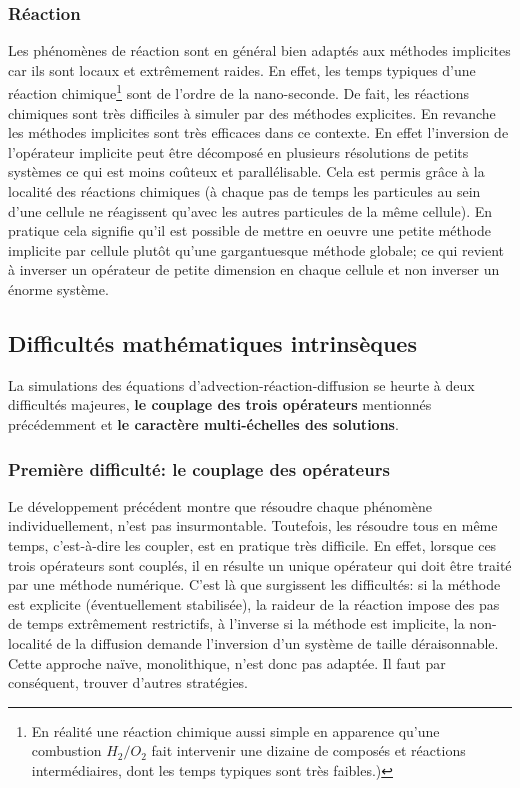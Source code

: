 \subsubsection{Réaction}
    Les phénomènes de réaction sont en général bien adaptés aux méthodes implicites car ils sont locaux et extrêmement raides.
    En effet, les temps typiques d'une réaction chimique\footnote{
    En réalité une réaction chimique aussi simple en apparence qu'une combustion $H_2/O_2$ fait intervenir une dizaine de composés et réactions intermédiaires, dont les temps typiques sont très faibles.)} sont de l'ordre de la nano-seconde.
    De fait, les réactions chimiques sont très difficiles à simuler par des méthodes explicites.
    En revanche les méthodes implicites sont très efficaces dans ce contexte. En effet l'inversion de l'opérateur implicite 
    peut être décomposé en plusieurs résolutions de petits systèmes ce qui est moins coûteux et parallélisable. Cela est permis grâce à la localité des réactions chimiques
    (à chaque pas de temps les particules au sein d'une cellule ne réagissent qu'avec les autres particules de la même cellule).
    En pratique cela signifie qu'il est possible de mettre en oeuvre une petite méthode implicite par cellule plutôt qu'une gargantuesque méthode globale; 
    ce qui revient à inverser un opérateur de petite dimension en chaque cellule et non inverser un énorme système.

\subsection{Difficultés mathématiques intrinsèques}
    La simulations des équations d'advection-réaction-diffusion se heurte à deux difficultés majeures, \textbf{le couplage des trois opérateurs} mentionnés précédemment
    et \textbf{le caractère multi-échelles des solutions}.

    \subsubsection{Première difficulté: le couplage des opérateurs}
        Le développement précédent montre que résoudre chaque phénomène individuellement, n'est pas insurmontable. 
        Toutefois, les résoudre tous en même temps, c'est-à-dire les coupler, est en pratique très difficile.
        En effet, lorsque ces trois opérateurs sont couplés, il en résulte un unique opérateur qui doit être traité par une méthode numérique.
        C'est là que surgissent les difficultés: si la méthode est explicite (éventuellement stabilisée), la raideur de la réaction impose des pas de temps extrêmement restrictifs,
        à l'inverse si la méthode est implicite, la non-localité de la diffusion demande l'inversion d'un système de taille déraisonnable. 
        Cette approche naïve, monolithique, n'est donc pas adaptée. Il faut par conséquent, trouver d'autres stratégies.

